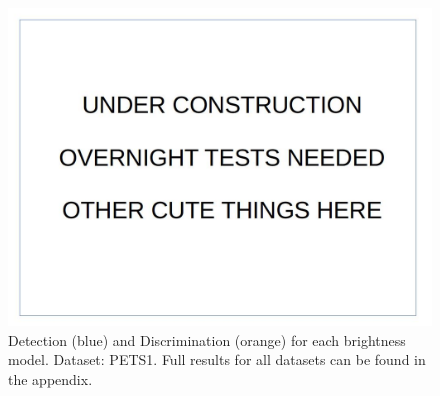 \documentclass[12pt]{report}
\begin{document}
\begin{figure}
\centering
  \includegraphics[width=1\linewidth]{figures/placeholder.jpg}
\caption{Detection (blue) and Discrimination (orange) for each brightness model. Dataset: PETS1. Full results for all datasets can be found in the appendix.}
\label{fig:pets1_bars_calc_all}
\end{figure}
\end{document}
